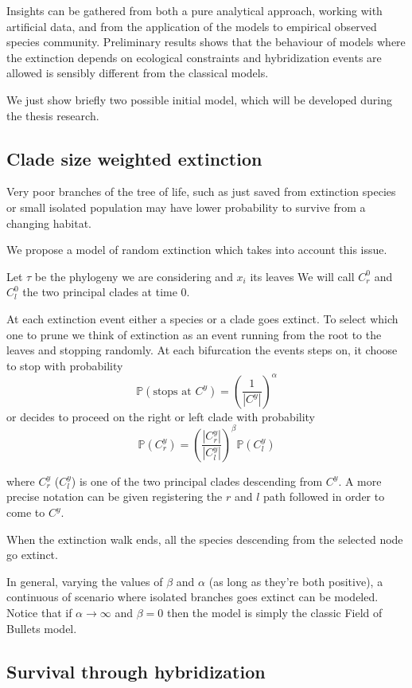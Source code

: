\documentclass[12pt,a4paper]{report}
\begin{document}
Insights can be gathered from both a pure analytical approach, working with artificial data, and from the application of the models to empirical observed species community. Preliminary results shows that the behaviour of models where the extinction depends on ecological constraints and hybridization events are allowed is sensibly different from the classical models.

We just show briefly two possible initial model, which will be developed during the thesis research. 

\subsection{Clade size weighted extinction}
Very poor branches of the tree of life, such as just saved from extinction species or small isolated population may have lower probability to survive from a changing habitat.

We propose a model of random extinction which takes into account this issue.

Let $\tau$ be the phylogeny we are considering and $x_i$ its leaves We will call $C^0_r$ and $C^0_l$ the two principal clades at time $0$.

At each extinction event either a species or a clade goes extinct. To select which one to prune we think of extinction as an event running from the root to the leaves and stopping randomly. At each bifurcation the events steps on, it choose to stop with probability
$$\mathbb{P}(\mbox{stops at }C^y)=\left(\frac{1}{|C^y|}\right)^\alpha$$
or decides to proceed on the right or left clade with probability
$$\mathbb{P}(C^y_r)=\left(\frac{|C^y_r|}{|C^y_l|}\right)^\beta \mathbb{P}(C^y_l)$$

where $C^y_r$ ($C^y_l$) is one of the two principal clades descending from $C^y$. A more precise notation can be given registering the $r$ and $l$ path followed in order to come to $C^y$.

When the extinction walk ends, all the species descending from the selected node go extinct.

In general, varying the values of $\beta$ and $\alpha$ (as long as they're both positive), a continuous of scenario where isolated branches goes extinct can be modeled. Notice that if $\alpha \to \infty$ and $\beta = 0$ then the model is simply the classic Field of Bullets model.

\subsection{Survival through hybridization}
\end{document}
